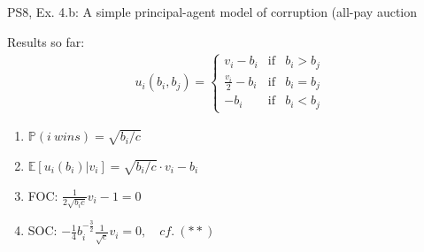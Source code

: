 \begin{frame}{PS8, Ex. 4.b: A simple principal-agent model of corruption (all-pay auction}
\begin{multicols}{2}
      Results so far: \vspace{-6pt}
      \begin{align*}
        u_i(b_i,b_j)=\left\{\begin{array}{lcl}
          v_i-b_i           & \text{if} & b_i>b_j \\
          \frac{v_i}{2}-b_i & \text{if} & b_i=b_j \\
          -b_i              & \text{if} & b_i<b_j
        \end{array}\right.
      \end{align*} \vspace{-16pt}
      \begin{enumerate}
        \item $\mathbb{P}(i\ wins)=\sqrt{b_i/c}$
        \item $\mathbb{E}[u_i(b_i)|v_i]=\sqrt{b_i/c}\cdot v_i-b_i$
        \item FOC: $\frac{1}{2\sqrt{b_ic}}v_i-1=0$
        \item[] SOC: $-\frac{1}{4}b_i^{-\frac{3}{2}}\frac{1}{\sqrt{c}}v_i=0,\quad cf.\ (**)$
      \end{enumerate}
      \vfill\null
    \end{multicols}
\end{frame}
